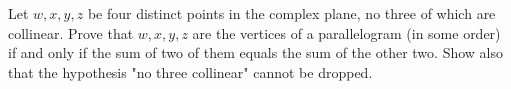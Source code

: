 Let $w,x,y,z$ be four distinct points in the complex plane, no three of which are collinear. Prove that $w,x,y,z$ are the vertices of a parallelogram (in some order) if and only if the sum of two of them equals the sum of the other two. Show also that the hypothesis "no three collinear" cannot be dropped.
